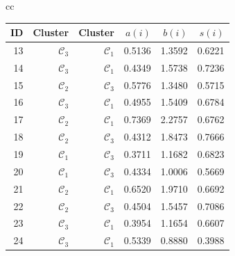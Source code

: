 \documentclass[xcolor={table}]{beamer}
\newcommand{\Midrule}[0]{\hline}
\newcommand{\Botrule}[0]{\hline}
\newcommand{\featN}[1]{\textsc{#1}}
\begin{document}
\begin{frame}
\begin{table}[!t]
\begin{scriptsize}
{\begin{tabular}{cc}
\begin{minipage}{0.5\textwidth}
{\begin{tabular*}{12.0pc}{@{\extracolsep{\fill}} rrrrrr @{}}
\featN{ID}	 & Cluster & Cluster & $a(i)$ & $b(i)$ & $s(i)$ \\
\Midrule
13 & $\mathcal{C}_3$ & $\mathcal{C}_1$ & 0.5136 & 1.3592 & 0.6221 \\ 
14 & $\mathcal{C}_3$ & $\mathcal{C}_1$ & 0.4349 & 1.5738 & 0.7236 \\ 
15 & $\mathcal{C}_2$ & $\mathcal{C}_3$ & 0.5776 & 1.3480 & 0.5715 \\ 
16 & $\mathcal{C}_3$ & $\mathcal{C}_1$ & 0.4955 & 1.5409 & 0.6784 \\ 
17 & $\mathcal{C}_2$ & $\mathcal{C}_1$ & 0.7369 & 2.2757 & 0.6762 \\ 
18 & $\mathcal{C}_2$ & $\mathcal{C}_3$ & 0.4312 & 1.8473 & 0.7666 \\ 
19 & $\mathcal{C}_1$ & $\mathcal{C}_3$ & 0.3711 & 1.1682 & 0.6823 \\ 
20 & $\mathcal{C}_1$ & $\mathcal{C}_3$ & 0.4334 & 1.0006 & 0.5669 \\ 
21 & $\mathcal{C}_2$ & $\mathcal{C}_1$ & 0.6520 & 1.9710 & 0.6692 \\ 
22 & $\mathcal{C}_2$ & $\mathcal{C}_3$ & 0.4504 & 1.5457 & 0.7086 \\ 
23 & $\mathcal{C}_3$ & $\mathcal{C}_1$ & 0.3954 & 1.1654 & 0.6607 \\ 
24 & $\mathcal{C}_3$ & $\mathcal{C}_1$ & 0.5339 & 0.8880 & 0.3988 \\ 
\Botrule
\end{tabular*}
}
\end{minipage}\\
\end{tabular}
}
{}
\end{scriptsize}
\end{table}
\end{frame} 
\end{document}
